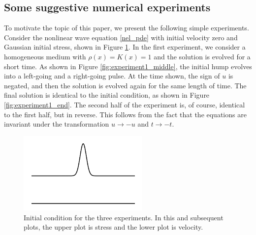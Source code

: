 \subsection{Some suggestive numerical experiments}
To motivate the topic of this paper, we present the following simple experiments.
Consider the nonlinear wave equation
\eqref{nel_pde} with initial velocity zero and Gaussian initial stress, 
shown in Figure \ref{fig:ic}.
In the first experiment, we consider a homogeneous medium with $\rho(x)=K(x)=1$ 
and the solution is evolved for a short time. %
As shown in Figure \ref{fig:experiment1_middle}, the initial 
hump evolves into a left-going
and a right-going pulse.  At the time shown, the sign of $u$ is negated,
and then the solution is evolved
again for the same length of time.  %
The final solution is identical to the initial condition, as shown in Figure
\ref{fig:experiment1_end}.  The second half of the
experiment is, of course, identical to the first half, but in reverse.  
This follows from the fact that the equations are invariant under the
transformation $u \rightarrow -u$ and $t \rightarrow -t$.

\begin{figure}
\centerline{
\includegraphics[width=2.5in]{figures/experiment1_ic.png}}
\caption{Initial condition for the three experiments.  In this and subsequent plots,
the upper plot is stress and the lower plot is velocity.\label{fig:ic}}
\end{figure}


